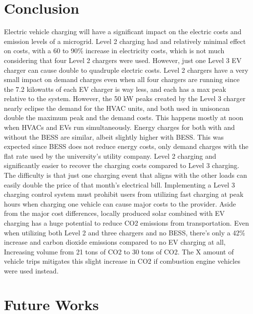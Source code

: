 \documentclass[conference]{IEEEtran}
\begin{document}
	\section{Conclusion}
		Electric vehicle charging will have a significant impact on the electric costs and emission levels of a microgrid. Level 2 charging had and relatively minimal effect on costs, with a 60 to 90\% increase in electricity costs, which is not much considering that four Level 2 chargers were used. However, just one Level 3 EV charger can cause double to quadruple electric costs. Level 2 chargers have a very small impact on demand charges even when all four chargers are running since the 7.2 kilowatts of each EV charger is way less, and each has a max peak relative to the system. However, the 50 kW peaks created by the Level 3 charger nearly eclipse the demand for the HVAC units, and both  used in unisoncan double the maximum peak and the demand costs. This happens mostly at noon when HVACs and EVs run simultaneously. Energy charges for both with and without the BESS are similar, albeit slightly higher with BESS. This was expected since BESS does not reduce energy costs, only demand charges with the flat rate used by the university’s utility company. Level 2 charging and significantly easier to recover the charging costs compared to Level 3 charging. The difficulty is that just one charging event that aligns with the other loads can easily double the price of that month’s electrical bill. Implementing a Level 3 charging control system must prohibit users from utilizing fast charging at peak hours when charging one vehicle can cause major costs to the provider. Aside from the major cost differences, locally produced solar combined with EV charging has a huge potential to reduce CO2 emissions from transportation. Even when utilizing both Level 2 and three chargers and no BESS, there’s only a 42\% increase and carbon dioxide emissions compared to no EV charging at all, Increasing volume from 21 tons of CO2 to 30 tons of CO2. The X amount of vehicle trips mitigates this slight increase in CO2 if combustion engine vehicles were used instead.
	\section{Future Works}
		
		
		
\end{document}
